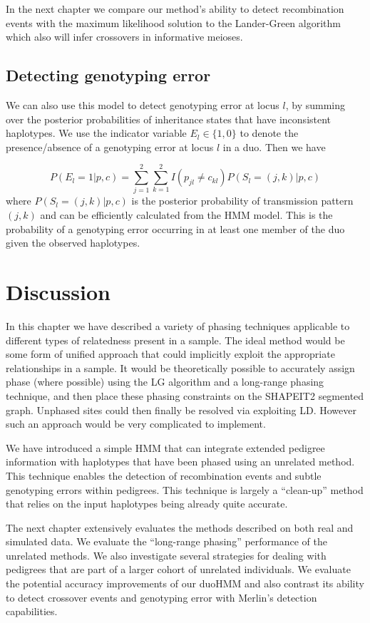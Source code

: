 In the next chapter we compare our method's ability to detect recombination events with the maximum likelihood solution to the Lander-Green algorithm which also will infer crossovers in informative meioses.

\subsection{Detecting genotyping error}
We can also use this model to detect genotyping error at locus $l$, by summing over the posterior probabilities of inheritance states that have inconsistent haplotypes. We use the indicator variable $E_l \in \{1, 0\}$ to denote the presence/absence of a genotyping error at locus $l$ in a duo. Then we have 

$$P(E_l=1|p,c) = \sum_{j=1}^2 \sum_{k=1}^2 I(p_{jl} \neq c_{kl}) P( S_l=(j,k) | p,c )  $$
where $P( S_l=(j,k) | p,c )$ is the posterior probability of transmission pattern $(j,k)$ and can be efficiently calculated from the HMM model. This is the probability of a genotyping error occurring in at least one member of the duo given the observed haplotypes. 

\section{Discussion}

In this chapter we have described a variety of phasing techniques applicable to different types of relatedness present in a sample.  The ideal method would be some form of unified approach that could implicitly exploit the appropriate relationships in a sample.  It would be theoretically possible to accurately assign phase (where possible) using the LG algorithm and a long-range phasing technique, and then place these phasing constraints on the SHAPEIT2 segmented graph.  Unphased sites could then finally be resolved via exploiting LD.  However such an approach would be very complicated to implement.

We have introduced a simple HMM that can integrate extended pedigree information with haplotypes that have been phased using an unrelated method.  This technique enables the detection of recombination events and subtle genotyping errors within pedigrees.  This technique is largely a ``clean-up'' method that relies on the input haplotypes being already quite accurate.

The next chapter extensively evaluates the methods described on both real and simulated data.  We evaluate the ``long-range phasing'' performance of the unrelated methods. We also investigate several strategies for dealing with pedigrees that are part of a larger cohort of unrelated individuals.  We evaluate the potential accuracy improvements of our duoHMM and also contrast its ability to detect crossover events and genotyping error with Merlin's detection capabilities.
